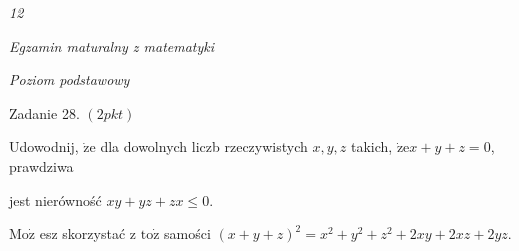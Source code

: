 \documentclass[a4paper,12pt]{article}
\begin{document}
{\it 12}

{\it Egzamin maturalny z matematyki}

{\it Poziom podstawowy}

Zadanie 28. $(2pkt)$

Udowodnij, $\dot{\mathrm{z}}\mathrm{e}$ dla dowolnych liczb rzeczywistych $x, y, z$ takich, $\dot{\mathrm{z}}\mathrm{e}x+y+z=0$, prawdziwa

jest nierówność $xy+yz+zx\leq 0.$

$\mathrm{M}\mathrm{o}\dot{\mathrm{z}}$ esz skorzystać z $\mathrm{t}\mathrm{o}\dot{\mathrm{z}}$ samości $(x+y+z)^{2}=x^{2}+y^{2}+z^{2}+2xy+2xz+2yz.$
\end{document}

